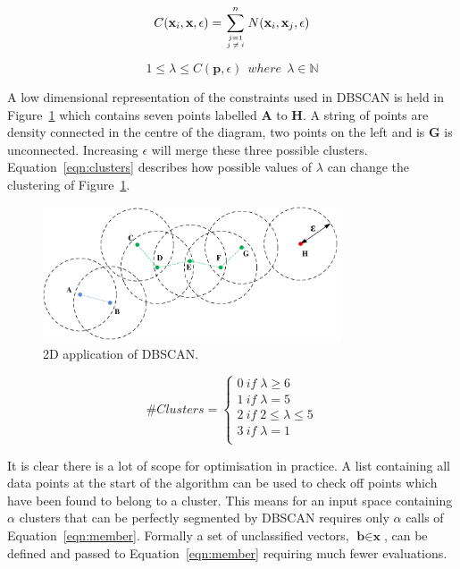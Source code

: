 \documentclass{ecsarticle}     %
\begin{document}
\begin{equation}
	C(\textbf{x}_i,\textbf{x},\epsilon) =  \sum\limits_{j=1 \atop j\:\neq\:i}^n N(\textbf{x}_i,\textbf{x}_j,\epsilon)	
	\label{eqn:member}
\end{equation}

\begin{equation}
	1 \leq \lambda \leq C(\textbf{p},\epsilon)\:\:where\:\:\lambda \in \mathbb{N}
	\label{eqn:inside}
\end{equation}

A low dimensional representation of the constraints used in DBSCAN is held in Figure~\ref{fig:circles} which contains seven points labelled \textbf{A} to \textbf{H}.
A string of points are density connected in the centre of the diagram, two points on the left and is \textbf{G} is unconnected.
Increasing $\epsilon$ will merge these three possible clusters.
Equation~\eqref{eqn:clusters} describes how possible values of $\lambda$ can change the clustering of Figure~\ref{fig:circles}.


\begin{figure}[ht]
   \centering
    \includegraphics[height = 4cm]{circles.pdf}
   \caption{2D application of DBSCAN.}
   \label{fig:circles}
\end{figure}

\begin{equation}
	\# Clusters = \left\{
		\begin{array}{l}
    		0\:if\; \lambda \geq 6\\
    		1\:if\; \lambda = 5 \\
			2\:if\; 2 \leq \lambda \leq 5 \\
			3\:if\; \lambda = 1\\
  		\end{array} \right.
	\label{eqn:clusters}
\end{equation}




It is clear there is a lot of scope for optimisation in practice.
A list containing all data points at the start of the algorithm can be used to check off points which have been found to belong to a cluster.
This means for an input space containing $\alpha$ clusters that can be perfectly segmented by DBSCAN requires only $\alpha$ calls of Equation~\eqref{eqn:member}.
Formally a set of unclassified vectors, $\textbf{b} \in \textbf{x} $, can be defined and passed to Equation~\eqref{eqn:member} requiring much fewer evaluations. 
\end{document}
